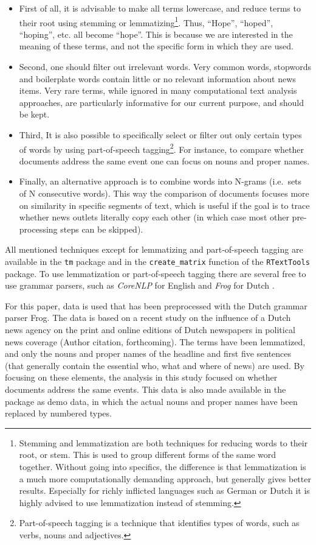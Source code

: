 \documentclass[]{article}
\let\rmarkdownfootnote\footnote%
\def\footnote{\protect\rmarkdownfootnote}
\begin{document}
\begin{itemize}
\item
  First of all, it is advisable to make all terms lowercase, and reduce
  terms to their root using stemming or lemmatizing\footnote{Stemming
    and lemmatization are both techniques for reducing words to their
    root, or stem. This is used to group different forms of the same
    word together. Without going into specifics, the difference is that
    lemmatization is a much more computationally demanding approach, but
    generally gives better results. Especially for richly inflicted
    languages such as German or Dutch it is highly advised to use
    lemmatization instead of stemming.}. Thus, ``Hope'', ``hoped'',
  ``hoping'', etc. all become ``hope''. This is because we are
  interested in the meaning of these terms, and not the specific form in
  which they are used.
\item
  Second, one should filter out irrelevant words. Very common words,
  stopwords and boilerplate words contain little or no relevant
  information about news items. Very rare terms, while ignored in many
  computational text analysis approaches, are particularly informative
  for our current purpose, and should be kept.
\item
  Third, It is also possible to specifically select or filter out only
  certain types of words by using part-of-speech tagging\footnote{Part-of-speech
    tagging is a technique that identifies types of words, such as
    verbs, nouns and adjectives.}. For instance, to compare whether
  documents address the same event one can focus on nouns and proper
  names.
\item
  Finally, an alternative approach is to combine words into N-grams
  (i.e.~sets of N consecutive words). This way the comparison of
  documents focuses more on similarity in specific segments of text,
  which is useful if the goal is to trace whether news outlets literally
  copy each other (in which case most other pre-processing steps can be
  skipped).
\end{itemize}

All mentioned techniques except for lemmatizing and part-of-speech
tagging are available in the \texttt{tm} package and in the
\texttt{create\_matrix} function of the \texttt{RTextTools} package. To
use lemmatization or part-of-speech tagging there are several free to
use grammar parsers, such as \emph{CoreNLP} for English \citep{corenlp}
and \emph{Frog} for Dutch \citep{bosch07}.

For this paper, data is used that has been preprocessed with the Dutch
grammar parser Frog. The data is based on a recent study on the
influence of a Dutch news agency on the print and online editions of
Dutch newspapers in political news coverage (Author citation,
forthcoming). The terms have been lemmatized, and only the nouns and
proper names of the headline and first five sentences (that generally
contain the essential who, what and where of news) are used. By focusing
on these elements, the analysis in this study focused on whether
documents address the same events. This data is also made available in
the package as demo data, in which the actual nouns and proper names
have been replaced by numbered types.
\end{document}
